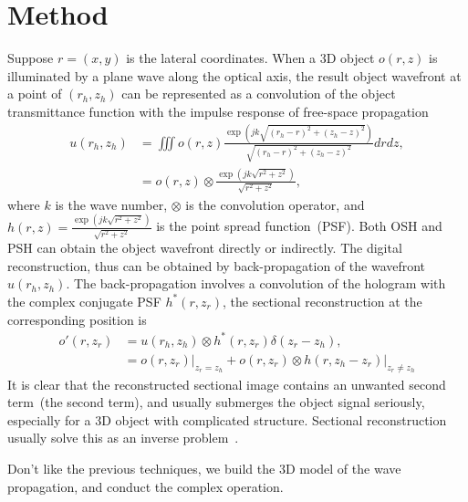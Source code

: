 \documentclass[9pt,twocolumn,twoside]{osajnl}
\begin{document}
\section{Method}\label{sec_method}
Suppose $r=(x,y)$ is the lateral coordinates. When a 3D object $o(r,z)$ is illuminated by a plane wave along the optical axis, the result object wavefront at a point of $(r_h, z_h)$ can be represented as a convolution of the object transmittance function with the impulse response of free-space propagation~\cite{Goodman2005}
\begin{equation}
\begin{aligned}
u(r_h,z_h) 
& = \iiint o(r,z) \frac{\exp\left(jk\sqrt{(r_h-r)^2 + (z_h-z)^2}\right)}{\sqrt{(r_h-r)^2 + (z_h-z)^2}} d r dz, \\
& = o(r,z) \otimes \frac{\exp\left(jk\sqrt{r^2 + z^2}\right)}{\sqrt{r^2 + z^2}},
\label{eq_3ddiffr}
\end{aligned}
\end{equation}
where $k$ is the wave number, $\otimes$ is the convolution operator, and $h(r,z)=\frac{\exp(jk\sqrt{r^2 + z^2})}{\sqrt{r^2 + z^2}}$ is the point spread function~(PSF). 
Both OSH and PSH can obtain the object wavefront directly or indirectly.
The digital reconstruction, thus can be obtained by back-propagation of the  wavefront $u(r_h,z_h)$. The back-propagation involves a convolution of the hologram with the complex conjugate PSF $h^*(r, z_r)$, the sectional reconstruction at the corresponding position is 
\begin{equation}
\begin{aligned}
o'(r,z_r) 
& = u(r_h,z_h)\otimes h^*(r,z_r) \delta(z_r-z_h) , \\
& = o(r,z_r)\vert_{z_r=z_h} + o(r,z_r) \otimes h(r, z_h-z_r) \vert_{z_r \neq z_h}
\label{eq_3ddiffr_inv}
\end{aligned}
\end{equation}
It is clear that the reconstructed sectional image contains an unwanted second term~(the second term), and usually submerges the object signal seriously, especially for a 3D object with complicated structure. Sectional reconstruction usually solve this as an inverse problem~\cite{Zhang2010JOSA}. 


Don't like the previous techniques, we build the 3D model of the wave propagation, and conduct the complex operation.
\end{document}
